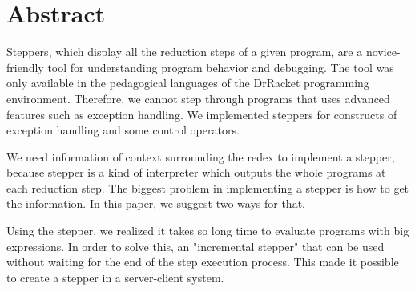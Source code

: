 \chapter*{Abstract}

Steppers, which display all the reduction steps of a given program,
are a novice-friendly tool for understanding program behavior and debugging.
The tool was only available in
the pedagogical languages of the DrRacket programming environment.
Therefore, we cannot step through programs that uses advanced features
such as exception handling.
We implemented steppers for constructs of exception handling and
some control operators.

We need information of context surrounding the redex
to implement a stepper,
because stepper is a kind of interpreter which outputs
the whole programs at each reduction step.
The biggest problem in implementing a stepper
is how to get the information.
In this paper, we suggest two ways for that.

Using the stepper,
we realized it takes so long time to evaluate programs with big expressions.
In order to solve this,
an "incremental stepper" that can be used
without waiting for the end of the step execution process.
This made it possible to create a stepper in a server-client system.

